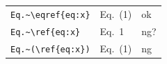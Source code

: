 \documentclass[preview]{standalone}
\newcommand{\tA}[1]{\textcolor{cA}{#1}}
\newcommand{\tC}[1]{\textcolor{cC}{#1}}
\newcommand{\tD}[1]{\textcolor{cD}{#1}}
\begin{document}
\begin{table}[h]
	\centering
	\begin{tabular}{lll}
		\verb|Eq.~\eqref{eq:x}| & Eq.~(1) & \tA{ok}  \\
		\verb|Eq.~\ref{eq:x}|   & Eq.~1   & \tC{ng?} \\
		\verb|Eq.~(\ref{eq:x})| & Eq.~(1) & \tD{ng}  \\
	\end{tabular}
\end{table}
\end{document}

